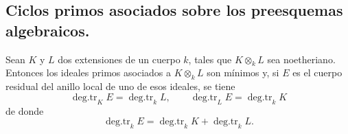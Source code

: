 \subsection{Ciclos primos asociados sobre los preesquemas algebraicos.}
\label{subsection:IV.2.4.2-fr}

\begin{proposition}[4.2.1]
Sean $K$ y $L$ dos extensiones de un cuerpo $k$, tales que $K\otimes_k L$
sea noetheriano. Entonces los ideales primos asociados a $K\otimes_k L$ son
mínimos y, si $E$ es el cuerpo residual del anillo local de uno de esos ideales,
se tiene
\begin{equation}
\tag{4.2.1.1}
\label{IV.2.4.2.1.1-fr}
\operatorname{deg.tr}_K E=\operatorname{deg.tr}_k L,
\qquad
\operatorname{deg.tr}_L E=\operatorname{deg.tr}_k K
\end{equation}
de donde
\begin{equation}
\tag{4.2.1.2}
\label{IV.2.4.2.1.2-fr}
\operatorname{deg.tr}_k E
=\operatorname{deg.tr}_k K+\operatorname{deg.tr}_k L.
\end{equation}
\end{proposition}

